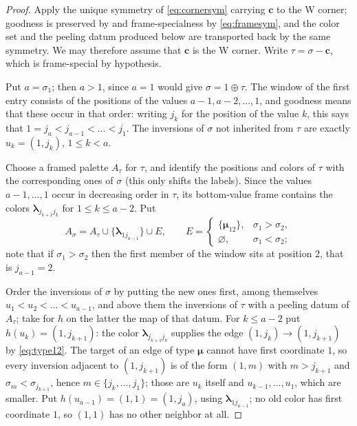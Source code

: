 \documentclass[12pt]{article}
\def\xspace{ }%
\theoremstyle{definition}
\newcommand{\goodness}{goodness\xspace}
\newcommand{\spc}{special\xspace}
\newcommand{\spcness}{specialness\xspace}
\newcommand{\pal}{palette\xspace}      %
\newcommand{\fpal}{framed \pal}        %
\newcommand{\pset}{A}                  %
\newcommand{\Wcr}{W\xspace}    %
\newcommand{\blam}{\boldsymbol{\lambda}}   %
\newcommand{\bmu}{\boldsymbol{\mu}}        %
\newcommand{\crn}{\mathbf{c}}              %
\begin{document}
\begin{proof}
Apply the unique symmetry of \eqref{eq:cornersym} carrying $\crn$ to the \Wcr
corner; \goodness is preserved by  and
frame-\spcness by
\eqref{eq:framesym}, and the color set and the peeling datum produced
below are transported back by the same symmetry. We may therefore assume
that $\crn$ is the \Wcr corner. Write $\tau = \sigma - \crn$, which is
frame-\spc by hypothesis.

Put $a = \sigma_1$; then $a > 1$, since $a = 1$ would give $\sigma = 1
\oplus \tau$. The window of the first entry consists of the positions of
the values $a-1,a-2,\dots,1$, and \goodness means that these occur in that
order: writing $j_k$ for the position of the value $k$, this says that
$1 = j_a < j_{a-1} < \dots < j_1$. The inversions of $\sigma$ not
inherited from $\tau$ are exactly $u_k = (1,j_k)$, $1 \le k < a$.

Choose a \fpal $\pset_\tau$ for $\tau$, and identify the
positions and colors of $\tau$ with the corresponding ones of $\sigma$
(this only shifts the labels). Since the values $a-1,\dots,1$ occur in
decreasing order in $\tau$, its bottom-value frame contains the colors
$\blam_{j_{k+1}j_k}$ for $1 \le k \le a-2$. Put
\begin{equation}\label{eq:cornerA}
   \pset_\sigma = \pset_\tau \cup \{\blam_{1j_{a-1}}\} \cup E,
   \qquad
   E = \begin{cases}
      \{\bmu_{12}\}, & \sigma_1 > \sigma_2,\\
      \varnothing, & \sigma_1 < \sigma_2;
   \end{cases}
\end{equation}
note that if $\sigma_1 > \sigma_2$ then the first member of the window
sits at position $2$, that is $j_{a-1} = 2$.

Order the inversions of $\sigma$ by putting the new ones first, among
themselves $u_1 < u_2 < \dots < u_{a-1}$, and above them the
inversions of $\tau$ with a peeling datum of $\pset_\tau$; take for $h$ on
the latter the map of that datum. For $k \le a-2$ put $h(u_k) =
(1,j_{k+1})$: the color $\blam_{j_{k+1}j_k}$ supplies the edge $(1,j_k)
\to (1,j_{k+1})$ by \eqref{eq:type12}. The target of an edge of type
$\bmu$ cannot have first coordinate $1$, so every inversion adjacent to
$(1,j_{k+1})$ is of the
form $(1,m)$ with $m > j_{k+1}$ and $\sigma_m < \sigma_{j_{k+1}}$, hence
$m \in \{j_k,\dots,j_1\}$; those are $u_k$ itself and
$u_{k-1},\dots,u_1$, which are smaller. Put $h(u_{a-1}) = (1,1) =
(1,j_a)$, using
$\blam_{1j_{a-1}}$; no old color has first coordinate $1$, so $(1,1)$ has
no other neighbor at all.


\end{proof}
\end{document}
